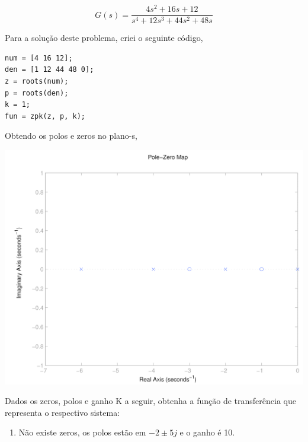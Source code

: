 \documentclass[paper=a4, fontsize=11pt]{article}
\begin{document}
\begin{list}{\textbf{Questão .}}{
\setlength{\labelwidth}{-2mm} \setlength{\parsep}{0mm}
\setlength{\topsep}{0mm} \setlength{\leftmargin}{0mm}}
    $$
    G(s) = \frac{4 s^2 + 16 s + 12}{s^4 + 12 s^3 +  44 s^2 + 48 s}
    $$


    Para a solução deste problema, criei o seguinte código,

 
     \begin{lstlisting}
num = [4 16 12];
den = [1 12 44 48 0];
z = roots(num);
p = roots(den);
k = 1;
fun = zpk(z, p, k);
     \end{lstlisting}

     Obtendo os polos e zeros no plano-s,
        \begin{center}
                \includegraphics[scale=0.15]{fig3q.png}
             \end{center}
    



\newpage

         \item
             Dados os zeros, polos e ganho K a seguir, obtenha 
             a função de transferência que representa o respectivo sistema:
        \begin{enumerate}
            \item

                Não existe zeros, os polos estão em $-2\pm5j$ e o ganho é 10.\\
                

\end{enumerate}
\end{list}
\end{document}
